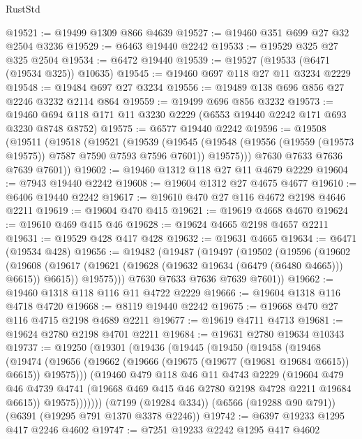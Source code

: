 \begin{lexlean}{RustStd}
\begin{coremodule}
{\begin{coremodule}
{{{{{{{{{{{{{{{{{{{{{{{{{{@19521 := @19499 @1309 @866 @4639
@19527 := @19460 @351 @699 @27 @32 @2504 @3236
@19529 := @6463 @19440 @2242
@19533 := @19529 @325 @27 @325 @2504
@19534 := @6472 @19440
@19539 := @19527 (@19533 (@6471 (@19534 @325)) @10635)
@19545 := @19460 @697 @118 @27 @11 @3234 @2229
@19548 := @19484 @697 @27 @3234
@19556 := @19489 @138 @696 @856 @27 @2246 @3232 @2114 @864
@19559 := @19499 @696 @856 @3232
@19573 := @19460 @694 @118 @171 @11 @3230 @2229 (@6553 @19440 @2242 @171 @693 @3230 @8748 @8752)
@19575 := @6577 @19440 @2242
@19596 := @19508
    (@19511
      (@19518
        (@19521
          (@19539
            (@19545
              (@19548 (@19556 (@19559 (@19573 @19575)) @7587 @7590 @7593 @7596 @7601))
              @19575)))
        @7630
        @7633
        @7636
        @7639
        @7601))
@19602 := @19460 @1312 @118 @27 @11 @4679 @2229
@19604 := @7943 @19440 @2242
@19608 := @19604 @1312 @27 @4675 @4677
@19610 := @6406 @19440 @2242
@19617 := @19610 @470 @27 @116 @4672 @2198 @4646 @2211
@19619 := @19604 @470 @415
@19621 := @19619 @4668 @4670
@19624 := @19610 @469 @415 @46
@19628 := @19624 @4665 @2198 @4657 @2211
@19631 := @19529 @428 @417 @428
@19632 := @19631 @4665
@19634 := @6471 (@19534 @428)
@19656 := @19482
    (@19487
      (@19497
        (@19502
          (@19596
            (@19602
              (@19608 (@19617 (@19621 (@19628 (@19632 @19634 (@6479 (@6480 @4665))) @6615)) @6615))
              @19575)))
        @7630
        @7633
        @7636
        @7639
        @7601))
@19662 := @19460 @1318 @118 @116 @11 @4722 @2229
@19666 := @19604 @1318 @116 @4718 @4720
@19668 := @8119 @19440 @2242
@19675 := @19668 @470 @27 @116 @4715 @2198 @4689 @2211
@19677 := @19619 @4711 @4713
@19681 := @19624 @2780 @2198 @4701 @2211
@19684 := @19631 @2780 @19634 @10343
@19737 := @19250
    (@19301
      (@19436
        (@19445
          (@19450
            (@19458
              (@19468
                (@19474
                  (@19656 (@19662 (@19666 (@19675 (@19677 (@19681 @19684 @6615)) @6615)) @19575)))
                (@19460
                  @479
                  @118
                  @46
                  @11
                  @4743
                  @2229
                  (@19604
                    @479
                    @46
                    @4739
                    @4741
                    (@19668 @469 @415 @46 @2780 @2198 @4728 @2211 @19684 @6615))
                  @19575)))))))
    (@7199 (@19284 @334))
    (@6566 (@19288 @90 @791))
    (@6391 (@19295 @791 @1370 @3378 @2246))
@19742 := @6397 @19233 @1295 @417 @2246 @4602
@19747 := @7251 @19233 @2242 @1295 @417 @4602
}}}}}}}}}}}}}}}}}}}}}}}}}}
\end{coremodule}}
\end{coremodule}
\end{lexlean}
